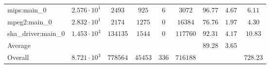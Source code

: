 \begin{tabular}{|l|c|c|c|c|c|c|c|c|}
mips:main\_0            & $ 2.576 \cdot 10^{1} $ & $ 2493   $ & $ 925   $ & $ 6   $ & $ 3072   $ & $ 96.77       $ & $ 4.67    $ & $ 6.11    $ \\
mpeg2:main\_0           & $ 2.832 \cdot 10^{1} $ & $ 2174   $ & $ 1275  $ & $ 0   $ & $ 16384  $ & $ 76.76       $ & $ 1.97    $ & $ 4.30    $ \\
sha\_driver:main\_0     & $ 1.453 \cdot 10^{3} $ & $ 134135 $ & $ 1544  $ & $ 0   $ & $ 117760 $ & $ 92.31       $ & $ 4.17    $ & $ 10.83   $ \\
\hline
Average                 & $                    $ & $        $ & $       $ & $     $ & $        $ & $ 89.28       $ & $ 3.65    $ & $         $ \\
\hline
Overall                 & $ 8.721 \cdot 10^{3} $ & $ 778564 $ & $ 45453 $ & $ 336 $ & $ 716188 $ & $             $ & $         $ & $ 728.23  $ \\
\hline
\end{tabular}
